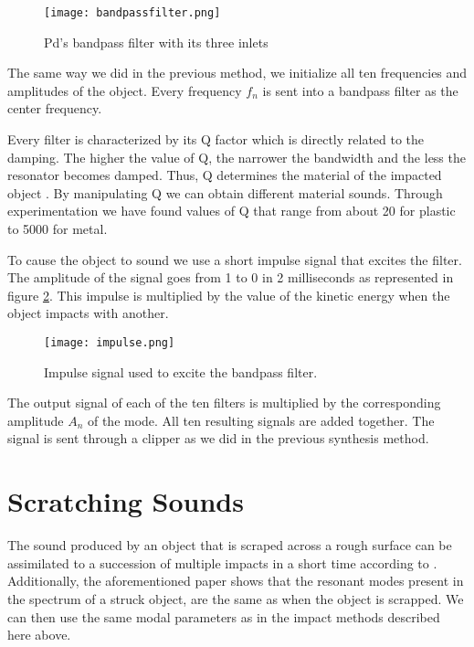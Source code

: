 \begin{figure}[H]
  \centering
    \texttt{[image: bandpassfilter.png]}
      \caption{Pd's bandpass filter with its three inlets}
      \label{fig:pdbandpass}
\end{figure} 

The same way we did in the previous method, we initialize all ten frequencies and amplitudes of the object. Every frequency $f_n$ is sent into a bandpass filter as the center frequency. 

Every filter is characterized by its Q factor which is directly related to the damping. The higher the value of Q, the narrower the bandwidth and the less the resonator becomes damped. Thus, Q determines the material of the impacted object \cite{gaver1993we}. By manipulating Q we can obtain different material sounds. Through experimentation we have found values of Q that range from about 20 for plastic to 5000 for metal. 

To cause the object to sound we use a short impulse signal that excites the filter. The amplitude of the signal goes from 1 to 0 in 2 milliseconds as represented in figure \ref{fig:impulse}. This impulse is multiplied by the value of the kinetic energy when the object impacts with another. 

\begin{figure}[H]
  \centering
    \texttt{[image: impulse.png]}
      \caption{Impulse signal used to excite the bandpass filter.}
      \label{fig:impulse}
\end{figure} 

The output signal of each of the ten filters is multiplied by the corresponding amplitude $A_n$ of the mode. All ten resulting signals are added together. The signal is sent through a clipper as we did in the previous synthesis method.

\section{Scratching Sounds}

The sound produced by an object that is scraped across a rough surface can be assimilated to a succession of multiple impacts in a short time according to \cite{gaver1993we}. Additionally, the aforementioned paper shows that the resonant modes present in the spectrum of a struck object, are the same as when the object is scrapped. We can then use the same modal parameters as in the impact methods described here above.

